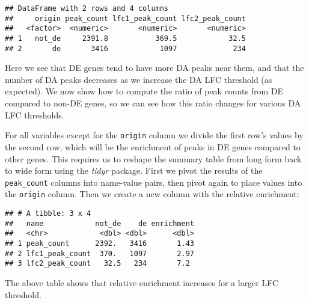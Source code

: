 \documentclass[
]{article}
\newenvironment{Shaded}{}{}
\newcommand{\DataTypeTok}[1]{\textcolor[rgb]{0.56,0.13,0.00}{#1}}
\newcommand{\KeywordTok}[1]{\textcolor[rgb]{0.00,0.44,0.13}{\textbf{#1}}}
\newcommand{\NormalTok}[1]{#1}
\newcommand{\OperatorTok}[1]{\textcolor[rgb]{0.40,0.40,0.40}{#1}}
\newcommand{\StringTok}[1]{\textcolor[rgb]{0.25,0.44,0.63}{#1}}
\begin{document}
\begin{verbatim}
## DataFrame with 2 rows and 4 columns
##     origin peak_count lfc1_peak_count lfc2_peak_count
##   <factor>  <numeric>       <numeric>       <numeric>
## 1   not_de     2391.8           369.5            32.5
## 2       de       3416            1097             234
\end{verbatim}

Here we see that DE genes tend to have more DA peaks near them, and that the
number of DA peaks decreases as we increase the DA LFC threshold (as expected).
We now show how to compute the ratio of peak counts from DE compared to non-DE
genes, so we can see how this ratio changes for various DA LFC thresholds.

For all variables except for the \texttt{origin} column we divide the first row's
values by the second row, which will be the enrichment of peaks in DE genes
compared to other genes. This requires us to reshape the summary table from
long form back to wide form using the \emph{tidyr} package. First we pivot the
results of the \texttt{peak\_count} columns into name-value pairs, then pivot again to
place values into the \texttt{origin} column. Then we create a new column with the
relative enrichment:

\begin{Shaded}
\end{Shaded}

\begin{verbatim}
## # A tibble: 3 x 4
##   name            not_de    de enrichment
##   <chr>            <dbl> <dbl>      <dbl>
## 1 peak_count      2392.   3416       1.43
## 2 lfc1_peak_count  370.   1097       2.97
## 3 lfc2_peak_count   32.5   234       7.2
\end{verbatim}

The above table shows that relative enrichment increases for a larger LFC
threshold.
\end{document}
